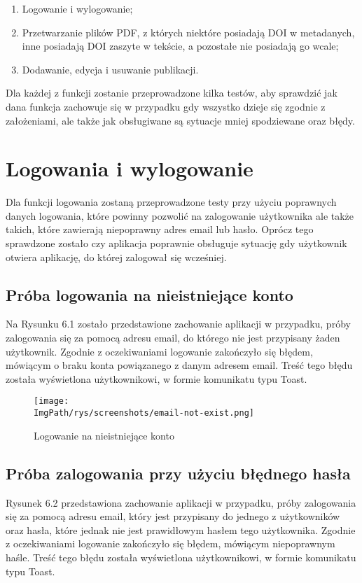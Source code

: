 \documentclass[a4paper,12pt,twoside,openany]{report}
\newcommand{\ImgPath}{.}
\begin{document}
\begin{enumerate}
	\item Logowanie i wylogowanie;
	\item Przetwarzanie plików PDF, z których niektóre posiadają DOI w metadanych, inne posiadają DOI zaszyte w tekście, a pozostałe nie posiadają go wcale;
	\item Dodawanie, edycja i usuwanie publikacji.
\end{enumerate}

Dla każdej z funkcji zostanie przeprowadzone kilka testów, aby sprawdzić jak dana funkcja zachowuje się w przypadku gdy wszystko dzieje się zgodnie z założeniami, ale także jak obsługiwane są sytuacje mniej spodziewane oraz błędy. 

\section{Logowania i wylogowanie}
Dla funkcji logowania zostaną przeprowadzone testy przy użyciu poprawnych danych logowania, które powinny pozwolić na zalogowanie użytkownika ale także takich, które zawierają niepoprawny adres email lub hasło. Oprócz tego sprawdzone zostało czy aplikacja poprawnie obsługuje sytuację gdy użytkownik otwiera aplikację, do której zalogował się wcześniej.


\pagebreak


\subsection{Próba logowania na nieistniejące konto}
Na Rysunku 6.1 zostało przedstawione zachowanie aplikacji w przypadku, próby zalogowania się za pomocą adresu email, do którego nie jest przypisany żaden użytkownik. Zgodnie z oczekiwaniami logowanie zakończyło się błędem, mówiącym o braku konta powiązanego z danym adresem email. Treść tego błędu została wyświetlona użytkownikowi, w formie komunikatu typu Toast.
\begin{figure}[!htbp]
	\begin{center}
		\centering
		\texttt{[image: \\ImgPath/rys/screenshots/email-not-exist.png]}
	\end{center}
	\caption{Logowanie na nieistniejące konto}
	\label{zrzutLogowaniePoprawne}
\end{figure}

\subsection{Próba zalogowania przy użyciu błędnego hasła}
Rysunek 6.2  przedstawiona zachowanie aplikacji w przypadku, próby zalogowania się za pomocą adresu email, który jest przypisany do jednego z użytkowników oraz hasła, które jednak nie jest prawidłowym hasłem tego użytkownika. Zgodnie z oczekiwaniami logowanie zakończyło się błędem, mówiącym niepoprawnym haśle. Treść tego błędu została wyświetlona użytkownikowi, w formie komunikatu typu Toast.
\end{document}
